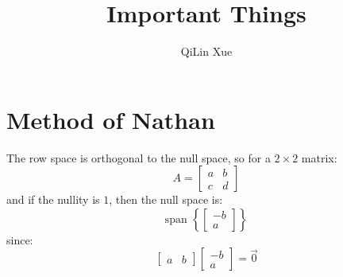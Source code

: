 \documentclass{article}
\title{Important Things}
\author{QiLin Xue}
\begin{document}
    \maketitle
    \section{Method of Nathan}
    The row space is orthogonal to the null space, so for a $2\times 2$ matrix:
    \begin{equation}
        A = \begin{bmatrix}
            a & b \\ 
            c &d
        \end{bmatrix}
    \end{equation}
    and if the nullity is $1$, then the null space is:
    \begin{equation}
        \text{span } \left\{\begin{bmatrix}
            -b \\ a
        \end{bmatrix}\right\}
    \end{equation}
    since:
    \begin{equation}
        \begin{bmatrix}
            a & b
        \end{bmatrix}\begin{bmatrix}
            -b \\ a
        \end{bmatrix} = \vec{0}
    \end{equation}
\end{document}
